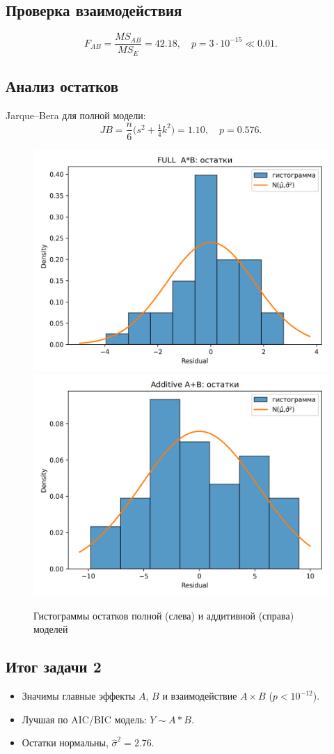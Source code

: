 \documentclass[areasetadvanced]{scrartcl}
\begin{document}
\subsection{Проверка взаимодействия}
\[
F_{AB}=\frac{MS_{AB}}{MS_E}=42.18,\quad
p=3\cdot10^{-15}\ll0.01.
\]

\subsection{Анализ остатков}
Jarque–Bera для полной модели:
\[
JB=\frac{n}{6}\bigl(s^2+\tfrac14k^2\bigr)=1.10,\quad p=0.576.
\]

\begin{figure}[H]
  \centering
  \includegraphics[width=.48\textwidth]{figs/task2_resid_hist_full.png}\hfill
  \includegraphics[width=.48\textwidth]{figs/task2_resid_hist_add.png}
  \caption{Гистограммы остатков полной (слева) и аддитивной (справа) моделей}
\end{figure}

\subsection{Итог задачи 2}
\begin{itemize}[nosep]
  \item Значимы главные эффекты $A$, $B$ и взаимодействие $A\times B$  
        ($p<10^{-12}$).
  \item Лучшая по AIC/BIC модель: $Y\sim A*B$.
  \item Остатки нормальны, $\hat\sigma^2=2.76$.
\end{itemize}
\end{document}
